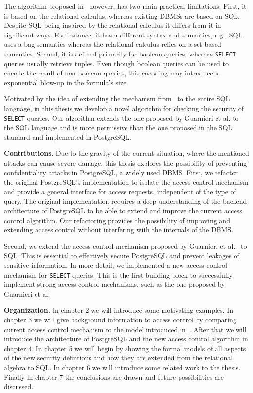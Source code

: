 The algorithm proposed in~\cite{guarnieri2016strong} however, has two main practical limitations.
%
First, it is based on the relational calculus, whereas existing DBMSs are based on SQL. Despite SQL being inspired by the relational calculus it differs from it in significant ways. For instance, it has a different syntax and semantics, e.g., SQL uses a bag semantics whereas the relational calculus relies on a set-based semantics.
%
Second, it is defined primarily for boolean queries, whereas \texttt{SELECT} queries usually retrieve tuples.
%
Even though boolean queries can be used to encode the result of non-boolean queries, this encoding may introduce a exponential blow-up in the formula's size.

Motivated by the idea of extending the mechanism from~\cite{guarnieri2016strong} to the entire SQL language, in this thesis we develop a novel algorithm for checking the security of \texttt{SELECT} queries.
%
Our algorithm extends the one proposed by Guarnieri et al. to the SQL language and is more permissive than the one proposed in the SQL standard and  implemented in PostgreSQL.

\smallskip
\noindent
{\bf Contributions.}
%
%
Due to the gravity of the current situation, where the mentioned attacks can cause severe damage, this thesis explores the possibility of preventing confidentiality attacks in PostgreSQL, a widely used DBMS. 
%
First, we refactor the original PostgreSQL's implementation to isolate the access control mechanism and provide a general interface for access requests, independent of the type of query.
%
The original implementation requires a deep understanding of the backend architecture of PostgreSQL to be able to extend and improve the current access control algorithm.
%
Our refactoring provides the possibility of improving and extending access control without interfering with the internals of the DBMS.
%

Second, we extend the access control mechanism proposed by Guarnieri et al.~\cite{guarnieri2016strong} to SQL.
%
This is essential to effectively secure PostgreSQL and prevent leakages of sensitive information.
%
In more detail, we implemented a new access control mechanism for \texttt{SELECT} queries.
%
This is the first building block to successfully implement strong access control mechanisms, such as the one proposed by Guarnieri et al.

\smallskip
\noindent
{\bf Organization.}
%
In chapter 2 we will introduce some motivating examples.
%
In chapter 3 we will give background information to access control by comparing current access control mechanism to the model introduced in~\cite{guarnieri2016strong}.
%
After that we will introduce the architecture of PostgreSQL and the new access control algorithm in chapter 4. 
%
In chapter 5 we will begin by showing the formal models of all aspects of the new security defintions and how they are extended from the relational algebra to SQL.  
%
In chapter 6 we will introduce some related work to the thesis. 
%
Finally in chapter 7 the conclusions are drawn and future possibilities are discussed.